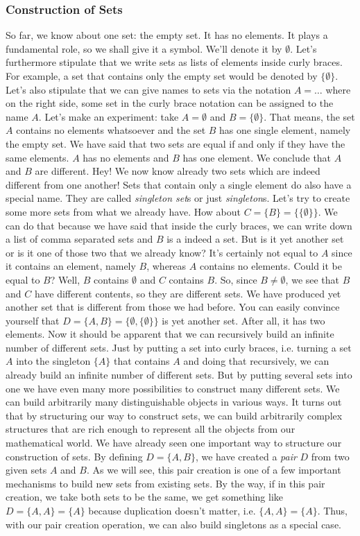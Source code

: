 \subsubsection{Construction of Sets}
So far, we know about one set: the empty set. It has no elements. It plays a fundamental role, so we shall give it a symbol. We'll denote it by $\emptyset$. Let's furthermore stipulate that we write sets as lists of elements inside curly braces. For example, a set that contains only the empty set would be denoted by $\{ \emptyset \}$. Let's also stipulate that we can give names to sets via the notation $A = \ldots$ where on the right side, some set in the curly brace notation can be assigned to the name $A$. Let's make an experiment: take $A = \emptyset$ and $B = \{ \emptyset \}$. That means, the set $A$ contains no elements whatsoever and the set $B$ has one single element, namely the empty set. We have said that two sets are equal if and only if they have the same elements. $A$ has no elements and $B$ has one element. We conclude that $A$ and $B$ are different. Hey! We now know already two sets which are indeed different from one another! Sets that contain only a single element do also have a special name. They are called \emph{singleton set}s or just \emph{singleton}s. Let's try to create some more sets from what we already have. How about $C = \{ B \} = \{ \{ \emptyset \} \}$. We can do that because we have said that inside the curly braces, we can write down a list of comma separated sets and $B$ is a indeed a set. But is it yet another set or is it one of those two that we already know? It's certainly not equal to $A$ since it contains an element, namely $B$, whereas $A$ contains no elements. Could it be equal to $B$? Well, $B$ contains $\emptyset$ and $C$ contains $B$. So, since $B \neq \emptyset$, we see that $B$ and $C$ have different contents, so they are different sets. We have produced yet another set that is different from those we had before. You can easily convince yourself that $D = \{ A, B\} = \{ \emptyset, \{\emptyset\} \}$ is yet another set. After all, it has two elements. Now it should be apparent that we can recursively build an infinite number of different sets. Just by putting a set into curly braces, i.e. turning a set $A$ into the singleton $\{A\}$ that contains $A$ and doing that recursively, we can already build an infinite number of different sets. But by putting several sets into one we have even many more possibilities to construct many different sets. We can build arbitrarily many distinguishable objects in various ways. It turns out that by structuring our way to construct sets, we can build arbitrarily complex structures that are rich enough to represent all the objects from our mathematical world. We have already seen one important way to structure our construction of sets. By defining $D = \{ A, B \}$, we have created a \emph{pair} $D$ from two given sets $A$ and $B$. As we will see, this pair creation is one of a few important mechanisms to build new sets from existing sets. By the way, if in this pair creation, we take both sets to be the same, we get something like $D = \{ A, A \} = \{ A \}$ because duplication doesn't matter, i.e. $ \{ A, A \} = \{ A \}$. Thus, with our pair creation operation, we can also build singletons as a special case.

